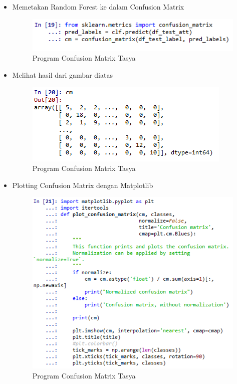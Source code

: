 \begin{itemize}
\item  Memetakan Random Forest ke dalam Confusion Matrix
\begin{figure}[ht]
\centering
\includegraphics[scale=0.5]{figures/cm1.png}
\caption{Program Confusion Matrix Tasya}
\label{Praktek}
\end{figure} 

\item  Melihat hasil dari gambar diatas
\begin{figure}[ht]
\centering
\includegraphics[scale=0.5]{figures/cm2.png}
\caption{Program Confusion Matrix Tasya}
\label{Praktek}
\end{figure} 

\item Plotting Confusion Matrix dengan Matplotlib
\begin{figure}[ht]
\centering
\includegraphics[scale=0.5]{figures/cm3.png}
\caption{Program Confusion Matrix Tasya}
\label{Praktek}
\end{figure}


\end{itemize}
